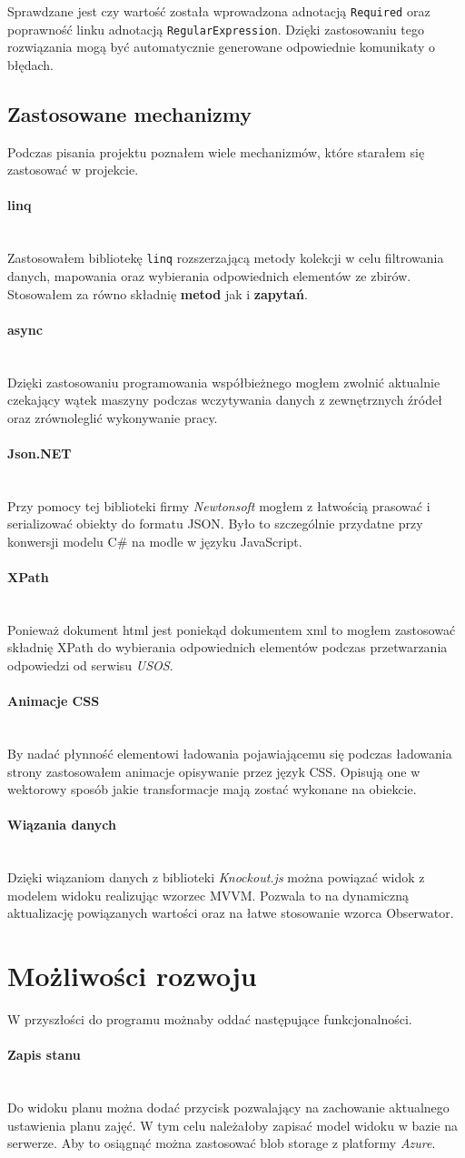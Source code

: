 \documentclass{mwart}
\newcommand{\paragraphnl}[1]{\paragraph{#1} \mbox{} \\} %
\begin{document}
Sprawdzane jest czy wartość została wprowadzona adnotacją \texttt{Required} oraz poprawność linku adnotacją \texttt{RegularExpression}. Dzięki zastosowaniu tego rozwiązania mogą być automatycznie generowane odpowiednie komunikaty o błędach.

\subsection{Zastosowane mechanizmy}
Podczas pisania projektu poznałem wiele mechanizmów, które starałem się zastosować w projekcie.

\paragraphnl{linq}
Zastosowałem bibliotekę \texttt{linq} rozszerzającą metody kolekcji w celu filtrowania danych, mapowania oraz wybierania odpowiednich elementów ze zbirów.
Stosowałem za równo składnię \textbf{metod} jak i \textbf{zapytań}.

\paragraphnl{async}
Dzięki zastosowaniu programowania współbieżnego mogłem zwolnić aktualnie czekający wątek maszyny podczas wczytywania danych z zewnętrznych źródeł oraz zrównoleglić wykonywanie pracy.

\paragraphnl{Json.NET}
Przy pomocy tej biblioteki firmy \textit{Newtonsoft} mogłem z łatwością prasować i serializować obiekty do formatu JSON. Było to szczególnie przydatne przy konwersji modelu C\# na modle w języku JavaScript.

\paragraphnl{XPath}
Ponieważ dokument html jest poniekąd dokumentem xml to mogłem zastosować składnię XPath do wybierania odpowiednich elementów podczas przetwarzania odpowiedzi od serwisu \textit{USOS}.

\paragraphnl{Animacje CSS}
By nadać płynność elementowi ładowania pojawiającemu się podczas ładowania strony zastosowałem animacje opisywanie przez język CSS.
Opisują one w wektorowy sposób jakie transformacje mają zostać wykonane na obiekcie.

\paragraphnl{Wiązania danych}
Dzięki wiązaniom danych z biblioteki \textit{Knockout.js} można powiązać widok z modelem widoku realizując wzorzec MVVM. Pozwala to na dynamiczną aktualizację powiązanych wartości oraz na łatwe stosowanie wzorca Obserwator.

\section{Możliwości rozwoju}
W przyszłości do programu możnaby oddać następujące funkcjonalności.

\paragraphnl{Zapis stanu}
Do widoku planu można dodać przycisk pozwalający na zachowanie aktualnego ustawienia planu zajęć. W tym celu należałoby zapisać model widoku w bazie na serwerze. Aby to osiągnąć można zastosować blob storage z platformy \textit{Azure}.
\end{document}
